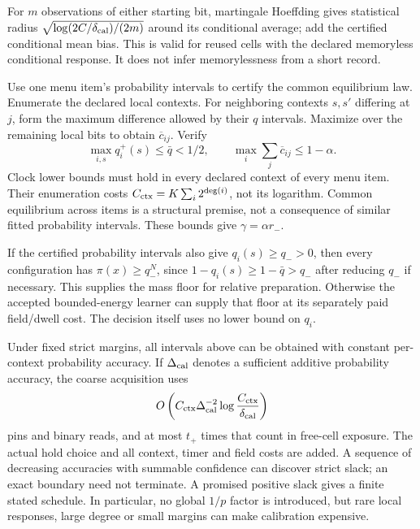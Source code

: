 For $m$ observations of either starting bit, martingale Hoeffding gives statistical radius $\sqrt{\log(2C/\delta_{
\rm cal})/(2m)}$ around its conditional average; add the certified conditional mean bias. This is valid for reused cells with the declared memoryless conditional response. It does not infer memorylessness from a short record.

Use one menu item's probability intervals to certify the common equilibrium law. Enumerate the declared local contexts. For neighboring contexts $s,s'$ differing at $j$, form the maximum difference allowed by their $q$ intervals. Maximize over the remaining local bits to obtain $\overline c_{ij}$. Verify
\begin{equation}
 \max_{i,s}q_i^+(s)\le\bar q<1/2,\qquad
 \max_i\sum_j\overline c_{ij}\le1-\alpha.
 \label{eq:coarsecertificate}
\end{equation}
Clock lower bounds must hold in every declared context of every menu item. Their enumeration costs $C_{
\rm ctx}=K\sum_i2^{\deg(i)}$, not its logarithm. Common equilibrium across items is a structural premise, not a consequence of similar fitted probability intervals. These bounds give $\gamma=\alpha r_-$.

If the certified probability intervals also give $q_i(s)\ge q_->0$, then every configuration has $\pi(x)\ge q_-^N$, since $1-q_i(s)\ge1-\bar q>q_-$ after reducing $q_-$ if necessary. This supplies the mass floor for relative preparation. Otherwise the accepted bounded-energy learner can supply that floor at its separately paid field/dwell cost. The decision itself uses no lower bound on $q_i$.

Under fixed strict margins, all intervals above can be obtained with constant per-context probability accuracy. If $\Delta_{
\rm cal}$ denotes a sufficient additive probability accuracy, the coarse acquisition uses
\begin{equation}
 O\left(C_{\rm ctx}\Delta_{\rm cal}^{-2}
            \log\frac{C_{\rm ctx}}{\delta_{\rm cal}}\right)
 \label{eq:calcost}
\end{equation}
pins and binary reads, and at most $t_+$ times that count in free-cell exposure. The actual hold choice and all context, timer and field costs are added. A sequence of decreasing accuracies with summable confidence can discover strict slack; an exact boundary need not terminate. A promised positive slack gives a finite stated schedule. In particular, no global $1/p$ factor is introduced, but rare local responses, large degree or small margins can make calibration expensive.

